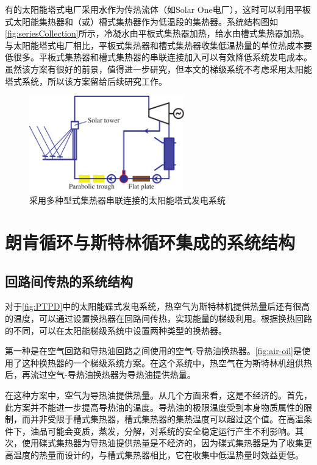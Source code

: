 有的太阳能塔式电厂采用水作为传热流体（如Solar One电厂），这时可以利用平板式太阳能集热器和（或）槽式集热器作为低温段的集热器。系统结构图如\autoref{fig:seriesCollection}所示，冷凝水由平板式集热器加热，给水由槽式集热器加热。与太阳能塔式电厂相比，平板式集热器和槽式集热器收集低温热量的单位热成本要低很多。平板式集热器和槽式集热器的串联连接加入可以有效降低系统发电成本。虽然该方案有很好的前景，值得进一步研究，但本文的梯级系统不考虑采用太阳能塔式系统，所以该方案留给后续研究工作。
\begin{figure}[htbp]
\centering 
\includegraphics[width=0.6\textwidth]{fig/SeriesCollection}
\caption{采用多种型式集热器串联连接的太阳能塔式发电系统}\label{fig:seriesCollection}
\end{figure}

\section{朗肯循环与斯特林循环集成的系统结构}

\subsection{回路间传热的系统结构}
\label{sec:hebc}

对于\autoref{fig:PTPD}中的太阳能碟式发电系统，热空气为斯特林机提供热量后还有很高的温度，可以通过设置换热器在回路间传热，实现能量的梯级利用。根据换热回路的不同，可以在太阳能梯级系统中设置两种类型的换热器。

第一种是在空气回路和导热油回路之间使用的空气-导热油换热器。\autoref{fig:air-oil}是使用了这种换热器的一个梯级系统方案。在这个系统中，热空气在为斯特林机组供热后，再流过空气-导热油换热器为导热油提供热量。

在这种方案中，空气为导热油提供热量。从几个方面来看，这是不经济的。首先，此方案并不能进一步提高导热油的温度。导热油的极限温度受到本身物质属性的限制，而并非受限于槽式集热器，槽式集热器的集热温度可以超过这个值。在高温条件下，油品可能会变质，蒸发，分解，对系统的安全稳定运行产生不利影响。其次，使用碟式集热器为导热油提供热量是不经济的，因为碟式集热器是为了收集更高温度的热量而设计的，与槽式集热器相比，它在收集中低温热量时效益更低。

